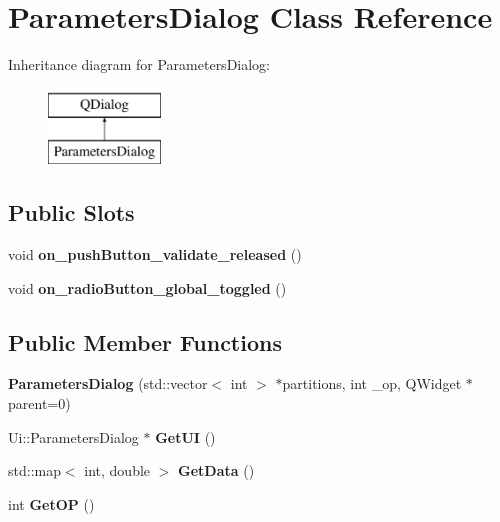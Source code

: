 \hypertarget{class_parameters_dialog}{}\section{Parameters\+Dialog Class Reference}
\label{class_parameters_dialog}
Inheritance diagram for Parameters\+Dialog\+:\begin{figure}[H]
\begin{center}
\leavevmode
\includegraphics[height=2.000000cm]{class_parameters_dialog}
\end{center}
\end{figure}
\subsection*{Public Slots}
\begin{DoxyCompactItemize}
\item 
void {\bfseries on\+\_\+push\+Button\+\_\+validate\+\_\+released} ()\hypertarget{class_parameters_dialog_ae707e377abff2711184699b8535f31ba}{}\label{class_parameters_dialog_ae707e377abff2711184699b8535f31ba}

\item 
void {\bfseries on\+\_\+radio\+Button\+\_\+global\+\_\+toggled} ()\hypertarget{class_parameters_dialog_aade2d2d1938ddceb34f8e10808910582}{}\label{class_parameters_dialog_aade2d2d1938ddceb34f8e10808910582}

\end{DoxyCompactItemize}
\subsection*{Public Member Functions}
\begin{DoxyCompactItemize}
\item 
{\bfseries Parameters\+Dialog} (std\+::vector$<$ int $>$ $\ast$partitions, int \+\_\+op, Q\+Widget $\ast$parent=0)\hypertarget{class_parameters_dialog_a278b5296661943e82111b3cc4da63be1}{}\label{class_parameters_dialog_a278b5296661943e82111b3cc4da63be1}

\item 
Ui\+::\+Parameters\+Dialog $\ast$ {\bfseries Get\+UI} ()\hypertarget{class_parameters_dialog_a177971eb352e39591607ad9504f2c937}{}\label{class_parameters_dialog_a177971eb352e39591607ad9504f2c937}

\item 
std\+::map$<$ int, double $>$ {\bfseries Get\+Data} ()\hypertarget{class_parameters_dialog_a4eaf4d045178cf33a9a9cdeed657791f}{}\label{class_parameters_dialog_a4eaf4d045178cf33a9a9cdeed657791f}

\item 
int {\bfseries Get\+OP} ()\hypertarget{class_parameters_dialog_a4d0eed1465b66b3c06c5031744e3314f}{}\label{class_parameters_dialog_a4d0eed1465b66b3c06c5031744e3314f}

\end{DoxyCompactItemize}


